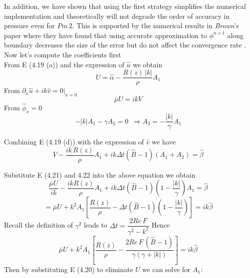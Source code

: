 In addition, we have shown that using the first strategy simplifies the numerical implementation and theoretically will not degrade the order of accuracy in pressure even for $Pm\,2$. This is supported by the numerical results in \emph{Brown}'s paper where they have found that using accurate approximation to $\phi^{n+1}$ along boundary decreases the size of the error but do not affect the convergence rate \cite{brown2001accurate}.\\

Now let's compute the coefficients first\\
From E (4.19 (a)) and the expression of $\hat{u}$ we obtain
\begin{equation}
U = \hat{\alpha} - \dfrac{R(z) \, |k|}{\rho} A_1
\end{equation}
From $\partial_x \hat{u} + ik \hat{v} = 0 |_{x = 0}$
\begin{equation}
\bar{\mu} U = ik V
\end{equation}
From $\hat{\phi}_x = 0$
\begin{equation}
-|k| A_1 - \gamma A_2 = 0 \, \, \, \Rightarrow A_2 = - \dfrac{|k|}{\gamma} A_1
\end{equation}

Combining E (4.19 (d)) with the expression of $\hat{v}$ we have
\begin{equation*}
V - \dfrac{ik \, R(z)}{\rho} A_1 + ik \Delta t (\hat{B} - 1) (A_1 + A_2) = \hat{\beta}
\end{equation*}

Substitute E (4.21) and 4.22 into the above equation we obtain
\begin{equation*}
\dfrac{\bar{\mu} U}{i k} - \dfrac{ik R(z)}{\rho} A_1 + ik \Delta t (\hat{B} - 1)(1 - \dfrac{|k|}{\gamma}) A_1 = \hat{\beta}
\end{equation*}
\begin{equation*}
= \bar{\mu} U + k^2 A_1[\dfrac{R(z)}{\rho} - \Delta t (\hat{B} - 1)(1 - \dfrac{|k|}{\gamma})] = ik \hat{\beta}
\end{equation*}
Recall the definition of $\gamma^2$ leads to $\Delta t = \dfrac{2 Re \, F}{\gamma^2 - k^2}$ Hence
\begin{equation}
\bar{\mu} U + k^2 A_1 [ \dfrac{R(z)}{\rho} - \dfrac{2 Re \, F \, (\hat{B} - 1)}{\gamma (\gamma + |k|)}] = ik \hat{\beta}
\end{equation}
Then by substituting E (4.20) to eliminate $U$ we can solve for $A_1$:


